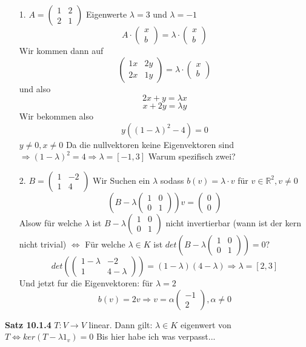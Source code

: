 \documentclass{article}
\begin{document}
\begin{itemize}
\item[1.]{$A= \begin{pmatrix}1&2\\2&1\end{pmatrix}$ Eigenwerte $\lambda = 3$ und $\lambda=-1$\\
\[A\cdot\begin{pmatrix}x\\b\end{pmatrix} = \lambda\cdot\begin{pmatrix}x\\b\end{pmatrix}\]
Wir kommen dann auf
\[\begin{pmatrix}1x&2y\\2x&1y\end{pmatrix}=\lambda\cdot\begin{pmatrix}x\\b\end{pmatrix}\]
und also
\[2x+y=\lambda x\]
\[x+2y=\lambda y\]
Wir bekommen also
\[y((1-\lambda)^2-4)=0\]
$y\neq0, x\neq0$ Da die nullvektoren keine Eigenvektoren sind $\Rightarrow (1-\lambda)^2=4\Rightarrow \lambda=[-1,3]$ Warum spezifisch zwei?}
\item[2.]{$B=\begin{pmatrix}1&-2\\1&4\end{pmatrix}$
 Wir Suchen ein $\lambda$ sodass $b(v)=\lambda\cdot v$ für $v\in \mathbb{R} ^2, v\neq0$
 \[ \left(B-\lambda\begin{pmatrix}1&0\\0&1\end{pmatrix}\right)v=\begin{pmatrix}0\\0\end{pmatrix}\] Alsow für welche $\lambda$ ist $B-\lambda\begin{pmatrix}1&0\\0&1\end{pmatrix}$ nicht invertierbar (wann ist der kern nicht trivial) $\Leftrightarrow$ Für welche $\lambda \in K$ ist $det\left(B-\lambda\begin{pmatrix}1&0\\0&1\end{pmatrix}\right)=0?$
 \[det\left(\begin{pmatrix}1-\lambda&-2\\1&4-\lambda\end{pmatrix}\right)=(1-\lambda)(4-\lambda)\Rightarrow \lambda =[2,3]\]
 Und jetzt fur die Eigenvektoren: für $\lambda = 2$
 \[b(v)=2v\Rightarrow v=\alpha\begin{pmatrix}-1\\2\end{pmatrix}, \alpha\neq0\]}
\end{itemize}
\textbf{Satz 10.1.4} $T:V\rightarrow V$ linear. Dann gilt: $\lambda \in K$ eigenwert von $T\Leftrightarrow ker(T-\lambda1_v)=0$
Bis hier habe ich was verpasst...
\end{document}
